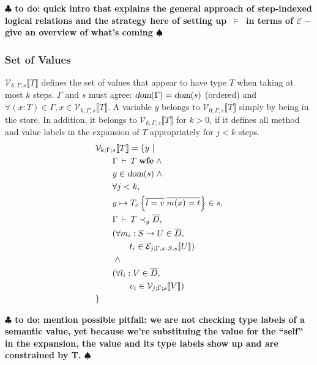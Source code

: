 \documentclass[9pt]{sigplanconf}
\newcommand{\gap}{\quad\quad}
\newcommand{\ts}{\,\vdash\,}
\newcommand{\dom}{\mbox{\sl dom}}
\newcommand{\expand}{\prec}
\newcommand{\remark}[1]{{\bf $\clubsuit$ #1 $\spadesuit$}}
\newcommand{\todo}[1]{\remark{to do: #1}}
\newcommand{\wfe}{\;\mbox{\textbf{wfe}}}
\newcommand{\ldefs}[1]{\left\{#1\right\}}
\newcommand{\seq}[1]{\overline{#1}}
\newcommand{\envplus}[1]{, #1}
\newcommand{\relv}[4]{\mathcal{V}_{#1;#2;#3}\llbracket#4\rrbracket}
\newcommand{\rele}[4]{\mathcal{E}_{#1;#2;#3}\llbracket#4\rrbracket}
\newcommand{\andl}{\;\wedge\;}
\newcommand{\ds}{\,\vDash\,}
\begin{document}
\todo{quick intro that explains the general approach of step-indexed
  logical relations and the strategy here of setting up $\ds$ in terms
  of $\mathcal{E}$ -- give an overview of what's coming}

\subsubsection{Set of Values}
$\relv k \Gamma s T$ defines the set of values that appear to have
type $T$ when taking at most $k$ steps. $\Gamma$ and $s$ must agree:
$\dom(\Gamma) = \dom(s)$ (ordered) and $\forall (x : T) \in \Gamma, x
\in \relv k \Gamma s T$. A variable $y$ belongs to $\relv 0 \Gamma s
T$ simply by being in the store. In addition, it belongs to $\relv k
\Gamma s T$ for $k > 0$, if it defines all method and value labels in
the expansion of $T$ appropriately for $j < k$ steps.
\begin{align*}
&\relv k \Gamma s T = \{ y \ |\\
&\gap \Gamma \ts T \wfe \andl\\
&\gap y \in \dom(s) \andl\\
&\gap \forall j < k,\\
&\gap y \mapsto T_c \ldefs{\seq{l = v}\;\seq{m(x)=t}} \in s,\\
&\gap \Gamma \ts T \expand_y \seq{D},\\
&\gap (\forall m_i : S \rightarrow U \in \seq{D},\\
&\gap\gap t_i \in \rele j {\Gamma \envplus{x : S}} s U)\\
&\gap \andl\\
&\gap (\forall l_i : V \in \seq{D},\\
&\gap\gap v_i \in \relv j \Gamma s V)\\
&\}
\end{align*}

\todo{mention possible pitfall: we are not checking type labels of a
  semantic value, yet because we're substituing the value for the
  ``self'' in the expansion, the value and its type labels show up and
  are constrained by T.}
\end{document}
